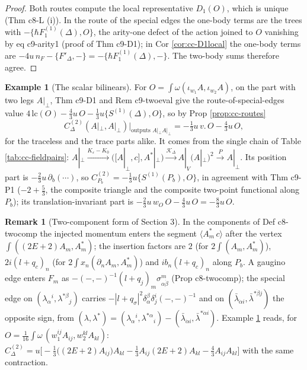 \documentclass[11pt]{article}
\numberwithin{equation}{section}
\theoremstyle{plain}
\theoremstyle{definition}
\newtheorem{example}[theorem]{Example}
\newtheorem{remark}[theorem]{Remark}
\newcommand{\Ap}{A|_{\perp}}
\newcommand{\AV}{A|_V}
\begin{document}
\begin{proof}
Both routes compute the local representative $D_1(O)$, which is unique (Thm c8-L (i)). In the route of the special edges the one-body terms are the trees with $-\{\hbar F_1^{(1)}(\Delta),O\}$, the arity-one defect of the action joined to $O$ vanishing by eq c9-arity1 (proof of Thm c9-D1); in Cor \ref{cor:cc-D1local} the one-body terms are $-4u\,n_F-\{F'_\Delta,-\}=-\{\hbar F_1^{(1)}(\Delta),-\}$. The two-body sums therefore agree.
\end{proof}

\begin{example}[The scalar bilinears]
\label{ex:cc-bilinear}
For $O=\int\omega(\iota_{w_1}A,\iota_{w_2}A)$, on the part with two legs $\Ap$, Thm c9-D1 and Rem c9-twoeval give the route-of-special-edges value $4\,\mathrm{lc}(O)-\tfrac43u\,O-\tfrac13u\{S^{(1)}(\Delta),O\}$, so by Prop \ref{prop:cc-routes}
\[
C^{(2)}_\Delta(\Ap,\Ap)\big|_{\text{outputs }\Ap\Ap}=-\tfrac13u\,v.\,O-\tfrac43u\,O,
\]
for the traceless and the trace parts alike. It comes from the single chain of Table \ref{tab:cc-fieldpairs}: $\Ap\xrightarrow{K_\varepsilon-K_0}\big([\Ap,c],A^*|_\perp\big)\xrightarrow{\mathcal K_\Delta}\AV(\Ap)^2\xrightarrow{P}\Ap$. Its position part is $-\tfrac23u\,\partial_b(\cdots)$, so $C^{(2)}_{P_b}=-\tfrac13u\{S^{(1)}(P_b),O\}$, in agreement with Thm c9-P1 ($-2+\tfrac53$, the composite triangle and the composite two-point functional along $P_b$); its translation-invariant part is $-\tfrac23u\,w_O\,O-\tfrac43u\,O=-\tfrac83u\,O$.
\end{example}

\begin{remark}[Two-component form of Section 3]
\label{rem:cc-twocomp2}
In the components of Def c8-twocomp the injected momentum enters the segment $\langle A^*_m\,c\rangle$ after the vertex $\int((2E+2)A_m,A^*_m)$; the insertion factors are $2$ (for $2\int(A_m,A^*_m)$), $2i(l+q_c)_n$ (for $2\int x_n(\partial_nA_m,A^*_m)$) and $ib_n(l+q_c)_n$ along $P_b$. A gaugino edge enters $F_m$ as $-(-,-)^{-1}(l+q_j)_m\sigma^m_{\alpha\dot\beta}$ (Prop c8-twocomp); the special edge on $(\lambda_\alpha{}^i,\lambda^{*\beta}{}_j)$ carries $-|l+q_\sigma|^2\delta_\alpha^\beta\delta^i_j(-,-)^{-1}$ and on $(\bar\lambda_{\dot\alpha i},\bar\lambda^{*\dot\beta j})$ the opposite sign, from $(\lambda,\lambda^*)=(\lambda_\alpha{}^i,\lambda^{*\alpha}{}_i)-(\bar\lambda_{\dot\alpha i},\bar\lambda^{*\dot\alpha i})$. Example \ref{ex:cc-bilinear} reads, for $O=\tfrac1{16}\int\omega\,(w_1^{ij}A_{ij},w_2^{kl}A_{kl})$: $C^{(2)}_\Delta=u\big[-\tfrac13\big((2E+2)A_{ij}\big)A_{kl}-\tfrac13A_{ij}(2E+2)A_{kl}-\tfrac43A_{ij}A_{kl}\big]$ with the same contraction.
\end{remark}
\end{document}
